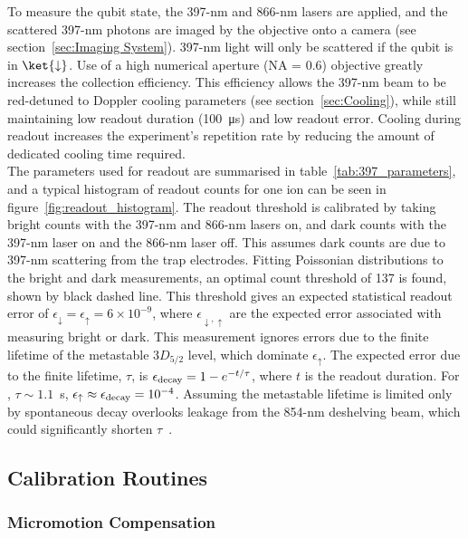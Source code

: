     To measure the qubit state, the 397-nm and 866-nm lasers
    are applied, and the scattered 397-nm photons are imaged by the objective onto a camera (see section~\ref{sec:Imaging System}). 397-nm light will only be scattered if the qubit is in $\ket{\downarrow}$.
    Use of a high numerical aperture (NA = 0.6) objective greatly increases the collection efficiency.
    This efficiency allows the 397-nm beam to be red-detuned to Doppler cooling parameters (see section~\ref{sec:Cooling}), while still maintaining low readout duration (100~\unit{\us}) and low readout error. 
    Cooling during readout increases the experiment's repetition rate by reducing the amount of dedicated cooling time required.\\
    The parameters used for readout are
    summarised in table~\ref{tab:397_parameters}, and a typical histogram of
    readout counts for one ion can be seen in
    figure~\ref{fig:readout_histogram}. The readout threshold is calibrated by taking bright counts with the 397-nm and 866-nm lasers on, and dark counts with the 397-nm laser on and the 866-nm laser off. This assumes dark counts are due to 397-nm scattering from the trap electrodes. 
    Fitting Poissonian distributions to the bright and dark measurements, an optimal count threshold of
    137 is found, shown by black dashed line. This threshold gives an expected
    statistical readout error of $\epsilon_\downarrow = \epsilon_\uparrow = 6\times10^{-9}$, where $\epsilon_{\downarrow,\uparrow}$ are the expected error associated with measuring bright or dark. This measurement ignores errors due to the
    finite lifetime of the metastable $3D_{5/2}$ level, which dominate $\epsilon_\uparrow$. The expected error due
    to the finite lifetime, $\tau$, is $\epsilon_{\rm decay} = 1 - e^{-t/\tau}$, where $t$ is the readout duration. For \ca, $\tau \sim 1.1$~s, $\epsilon_\uparrow \approx \epsilon_{\rm decay}  = 
    10^{-4}$. 
    Assuming the metastable lifetime is limited only by spontaneous decay overlooks leakage from the 854-nm deshelving beam, which could significantly shorten $\tau$~\cite{sotirova2024high-fidelity}. \\
    
\subsection{Calibration Routines}
\subsubsection{Micromotion Compensation}
\label{sec:Micromotion}

